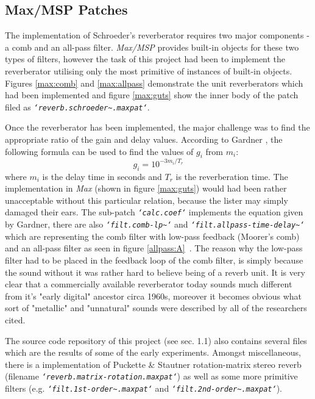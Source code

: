 \documentclass[12pt]{report}
\begin{document}
\subsection{Max/MSP Patches}

The implementation of Schroeder's reverberator requires two major components -
a comb and an all-pass filter. \emph{Max/MSP} provides built-in objects for
these two types of filters, however the task of this project had been to
implement the reverberator utilising only the most primitive of instances of
built-in objects. Figures \ref{max:comb} and \ref{max:allpass} demonstrate
the unit reverberators which had been implemented and figure \ref{max:guts}
show the inner body of the patch filed as
\emph{\texttt{`reverb.schroeder\~{}.maxpat`}}.

Once the reverberator has been implemented, the major challenge was to find
the appropriate ratio of the gain and delay values. According to Gardner
\cite{gardner1998algorithms}, the following formula can be used to find the
values of $g_i$ from $m_i$:\begin{equation}\label{eq:coef}
  g_i=10^{-3m_i/T_r}
\end{equation}
where $m_i$ is the delay time in seconds and $T_r$ is the reverberation time.
The implementation in \emph{Max} (shown in figure \ref{max:guts}) would had
been rather unacceptable without this particular relation, because the lister
may simply damaged their ears. The sub-patch \emph{\texttt{`calc.coef`}}
implements the equation given by Gardner, there are also \emph{\texttt{`filt.comb-lp\~{}`}} and
\emph{\texttt{`filt.allpass-time-delay\~{}`}} which are representing the comb
filter with low-pass feedback (Moorer's comb) and an all-pass filter as seen
in figure \ref{allpass:A}\ . The reason why the low-pass filter had to be
placed in the feedback loop of the comb filter, is simply because the sound
without it was rather hard to believe being of a reverb unit. It is very clear
that a commercially available reverberator today sounds much different from
it's "early digital" ancestor circa 1960s, moreover it becomes obvious what
sort of "metallic" and "unnatural" sounds were described by all of the
researchers cited.


The source code repository of this project (see sec. 1.1) also contains
several files which are the results of some of the early experiments.
Amongst miscellaneous, there is a implementation of Puckette \& Stautner
rotation-matrix stereo reverb (filename \emph{\texttt{`reverb.matrix-rotation.maxpat`}})
as well as some more primitive filters (e.g. \emph{\texttt{`filt.1st-order\~{}.maxpat`}}
and \emph{\texttt{`filt.2nd-order\~{}.maxpat`}}).
\end{document}
